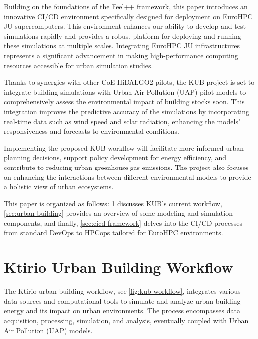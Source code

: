 \documentclass[runningheads]{llncs}
\begin{document}
Building on the foundations of the Feel++ framework, this paper introduces an innovative CI/CD environment specifically designed for deployment on EuroHPC JU supercomputers. This environment enhances our ability to develop and test simulations rapidly and provides a robust platform for deploying and running these simulations at multiple scales. Integrating EuroHPC JU infrastructures represents a significant advancement in making high-performance computing resources accessible for urban simulation studies.

Thanks to synergies with other CoE HiDALGO2 pilots, the KUB project is set to integrate building simulations with Urban Air Pollution (UAP) pilot models to comprehensively assess the environmental impact of building stocks soon. This integration improves the predictive accuracy of the simulations by incorporating real-time data such as wind speed and solar radiation, enhancing the models' responsiveness and forecasts to environmental conditions.

Implementing the proposed KUB workflow will facilitate more informed urban planning decisions, support policy development for energy efficiency, and contribute to reducing urban greenhouse gas emissions. The project also focuses on enhancing the interactions between different environmental models to provide a holistic view of urban ecosystems.

This paper is organized as follows: \cref{sec:kub-workflow} discusses KUB's current workflow, \cref{sec:urban-building} provides an overview of some modeling and simulation components, and finally, \cref{sec:cicd-framework} delves into the CI/CD processes from standard DevOps to HPCops tailored for EuroHPC environments.


\section{Ktirio Urban Building Workflow}
\label{sec:kub-workflow}

The Ktirio urban building workflow, see \cref{fig:kub-workflow}, integrates various data sources and computational tools to simulate and analyze urban building energy and its impact on urban environments. The process encompasses data acquisition, processing, simulation, and analysis, eventually coupled with Urban Air Pollution (UAP) models.
\end{document}
